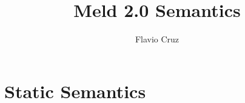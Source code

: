 \documentclass[11pt]{article}
\title{Meld 2.0 Semantics}
\author{Flavio Cruz}
\begin{document}
\newcommand{\trnstile}{\sststile{}{}}
\newcommand{\typ}[1]{\m{#1} \; \m{typ}}
\newcommand{\btyp}[1]{\m{#1} \; \m{btyp}}
\newcommand{\eexpr}[2]{\m{#1}:\m{#2}}
\newcommand{\aexp}[4]{#1;#2 \sststile{}{} \eexpr{#3}{#4}}
\newcommand{\expr}[3]{\aexp{\Psi}{#1}{#2}{#3}}
\newcommand{\tab}[0]{\;\;\;\;}
\newcommand{\elet}[3]{\m{let} \; #1 \; = \; #2 \; \m{in} \; #3 \; \m{end}}
\newcommand{\const}[2]{\m{const}(\mathit{#1}, #2)}
\newcommand{\getconst}[1]{\m{getconst}(\mathit{#1})}
\newcommand{\external}[2]{\m{external}(\mathit{#1}, #2)}
\newcommand{\callexternal}[2]{\m{callexternal}(\mathit{#1}, #2)}
\newcommand{\fun}[3]{\m{fun}(\mathit{#1}, #2, #3)}
\newcommand{\callfun}[2]{\m{callfun}(\mathit{#1}, #2)}
\newcommand{\decl}[2]{\m{decl} \; #1 \; [#2]}
\newcommand{\val}[2]{\m{val} \; #1 : \m{#2}}
\newcommand{\declconst}[3]{\const{#1}{#2} \; \m{of} \; #3}
\newcommand{\declfun}[4]{\fun{#1}{#2}{#3} \; \m{of} \; #4}
\newcommand{\eval}[2]{\Psi \; ; \; #1 \rightarrow #2}
\newcommand{\constraint}[1]{\m{constraint} \; #1}
\newcommand{\fact}[2]{\m{fact} \; #1(#2)}
\newcommand{\mif}[3]{\m{if} \; #1 \; \m{then} \; #2 \; \m{else} \; #3 \; \m{end}}
\newcommand{\mrule}[3]{\Psi ; #1 ; #2 \trnstile #3 \; \m{rule}}
\newcommand{\mrulebody}[4]{\Psi ; #1 ; #2 ; #3 \trnstile #4 \; \m{body}}
\newcommand{\mrulehead}[3]{\Psi ; #1 ; #2 \trnstile #3 \; \m{head}}
\newcommand{\mrulestart}[1]{\m{rule} \; \Psi \; / \; #1}
\newcommand{\comp}[0]{\m{comp} \; }
\newcommand{\aggregate}[4]{[\m{#1} ; #2 ; #3 \Rightarrow #4]}
\newcommand{\aggregatetype}[3]{[\m{#1}] \; / \; #2 \rightsquigarrow #3}
\newcommand{\changes}[6]{#1 ; #2 ; #3 ; #4 \Rightarrow #5 ; #6}
\newcommand{\changesb}[7]{#1 ; #2 ; #3 ; #4 \Rightarrow #5 ; #6 ; #7}
\newcommand{\apply}[5]{\m{apply} \; #1 ; #2 ; #3 \rightarrow #4 ; #5}
\newcommand{\applyb}[6]{\m{apply} \; #1 ; #2 ; #3 \rightarrow #4 ; #5 ; #6}
\newcommand{\derive}[8]{\m{derive} \; #1 ; #2 ; #3 ; #4 ; #5 ; #6 \rightarrow #7 ; #8}
\newcommand{\deriveb}[9]{\m{derive} \; #1 ; #2 ; #3 ; #4 ; #5 ; #6 \rightarrow #7 ; #8 ; #9}
\newcommand{\match}[4]{\m{match} \; #1 ; #2 ; #3 \rightarrow #4}
\newcommand{\equal}[2]{#1 = #2}
\newcommand{\at}[2]{#1 \; @ \; #2}

\maketitle

\section{Static Semantics}
\end{document}
